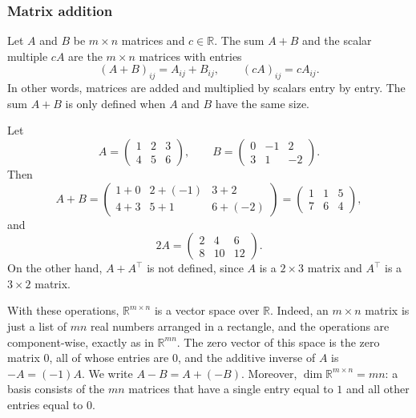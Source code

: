 \subsubsection{Matrix addition}

\begin{definition}
    Let $A$ and $B$ be $m \times n$ matrices and $c \in \mathbb{R}$. The sum $A + B$ and the scalar multiple $cA$ are the $m \times n$ matrices with entries
    \[(A + B)_{ij} = A_{ij} + B_{ij}, \qquad (cA)_{ij} = c A_{ij}.\]
    In other words, matrices are added and multiplied by scalars entry by entry. The sum $A + B$ is only defined when $A$ and $B$ have the same size.
\end{definition}

\begin{example}
    Let
    \[A = \begin{pmatrix}
        1 & 2 & 3 \\
        4 & 5 & 6
    \end{pmatrix}, \qquad B = \begin{pmatrix}
        0 & -1 & 2 \\
        3 & 1 & -2
    \end{pmatrix}.\]
    Then
    \[A + B = \begin{pmatrix}
        1 + 0 & 2 + (-1) & 3 + 2 \\
        4 + 3 & 5 + 1 & 6 + (-2)
    \end{pmatrix} = \begin{pmatrix}
        1 & 1 & 5 \\
        7 & 6 & 4
    \end{pmatrix},\]
    and
    \[2A = \begin{pmatrix}
        2 & 4 & 6 \\
        8 & 10 & 12
    \end{pmatrix}.\]
    On the other hand, $A + A^\top$ is not defined, since $A$ is a $2 \times 3$ matrix and $A^\top$ is a $3 \times 2$ matrix.
\end{example}

\begin{remark}\label{L1-rem:matrix-space}
    With these operations, $\mathbb{R}^{m \times n}$ is a vector space over $\mathbb{R}$. Indeed, an $m \times n$ matrix is just a list of $mn$ real numbers arranged in a rectangle, and the operations are component-wise, exactly as in $\mathbb{R}^{mn}$. The zero vector of this space is the zero matrix $0$, all of whose entries are $0$, and the additive inverse of $A$ is $-A = (-1)A$. We write $A - B = A + (-B)$. Moreover, $\dim \mathbb{R}^{m \times n} = mn$: a basis consists of the $mn$ matrices that have a single entry equal to $1$ and all other entries equal to $0$.
\end{remark}

